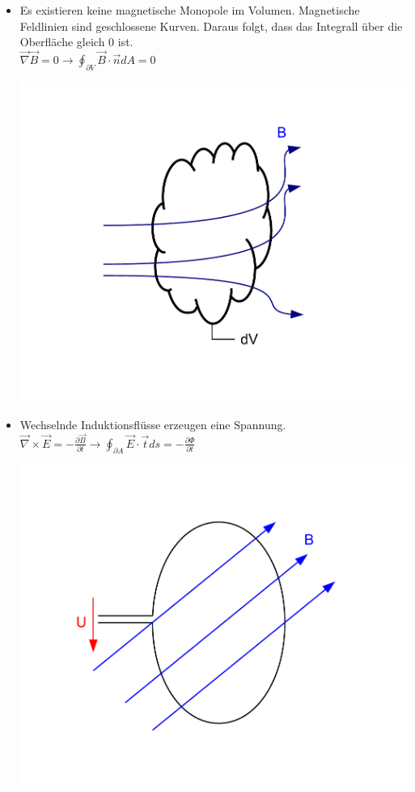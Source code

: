 \documentclass[a4paper]{scrartcl}
\begin{document}
\begin{itemize}
\item Es existieren keine magnetische Monopole im Volumen. Magnetische
Feldlinien sind geschlossene Kurven. Daraus folgt, dass das Integrall über die
Oberfläche gleich 0 ist.\\
$ \vec \nabla \vec B = 0 \rightarrow \oint_{\partial V} \vec B \cdot \vec n
dA = 0$
\begin{center}
\includegraphics[scale=0.5]{images/maxwell_2.pdf}
\end{center}

\item Wechselnde Induktionsflüsse erzeugen eine Spannung.\\
$ \vec \nabla \times \vec E = - \frac{\partial \vec B}{\partial t} \rightarrow
\oint_{\partial A} \vec E \cdot \vec t ds = - \frac{\partial \Phi}{\partial t}$
\begin{center}
\includegraphics[scale=0.5]{images/maxwell_3.pdf}
\end{center}


\end{itemize}
\end{document}
